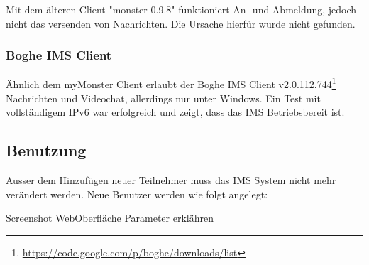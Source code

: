 Mit dem älteren Client "monster-0.9.8" funktioniert An- und Abmeldung, jedoch nicht das versenden von Nachrichten. Die Ursache hierfür wurde nicht gefunden.

\subsubsection{Boghe IMS Client}
Ähnlich dem myMonster Client erlaubt der Boghe IMS Client v2.0.112.744\footnote{\url{https://code.google.com/p/boghe/downloads/list}}
Nachrichten und Videochat, allerdings nur unter Windows. Ein Test mit vollständigem IPv6 war erfolgreich und zeigt, dass das IMS Betriebsbereit ist.

\subsection{Benutzung}

Ausser dem Hinzufügen neuer Teilnehmer muss das IMS System nicht mehr verändert werden. Neue Benutzer werden wie folgt angelegt:

Screenshot WebOberfläche
Parameter erklähren
